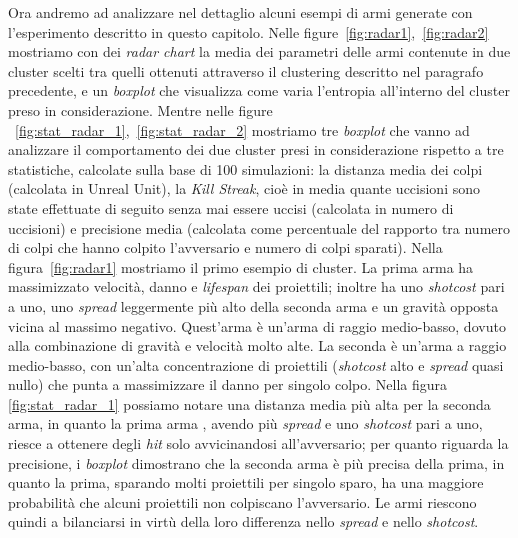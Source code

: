 \documentclass[12pt, italian]{toptesi}
\begin{document}
Ora andremo ad analizzare nel dettaglio alcuni esempi di armi generate con l'esperimento descritto in questo capitolo.
Nelle figure~\ref{fig:radar1},~\ref{fig:radar2} mostriamo con dei \emph{radar chart} la media dei parametri delle armi contenute in due cluster scelti tra quelli ottenuti attraverso il clustering descritto nel paragrafo precedente, e un \emph{boxplot} che visualizza come varia l'entropia all'interno del cluster preso in considerazione.
Mentre nelle figure ~\ref{fig:stat_radar_1},~\ref{fig:stat_radar_2} mostriamo tre \emph{boxplot} che vanno ad analizzare il comportamento dei due cluster presi in considerazione rispetto a tre statistiche, calcolate sulla base di 100 simulazioni: la distanza media dei colpi (calcolata in Unreal Unit),  la \emph{Kill Streak}, cioè in media quante uccisioni sono state effettuate di seguito senza mai essere uccisi (calcolata in numero di uccisioni) e precisione media (calcolata come percentuale del rapporto tra numero di colpi che hanno colpito l'avversario e numero di colpi sparati).
Nella figura~\ref{fig:radar1} mostriamo il primo esempio di cluster.
La prima arma ha massimizzato velocità, danno e \emph{lifespan} dei proiettili; inoltre ha uno \emph{shotcost} pari a uno, uno \emph{spread} leggermente più alto della seconda arma e un gravità opposta vicina al massimo negativo. Quest'arma è un'arma di raggio medio-basso, dovuto alla combinazione di gravità e velocità molto alte. La seconda è un'arma a raggio medio-basso, con un'alta concentrazione di proiettili (\emph{shotcost} alto e \emph{spread} quasi nullo) che punta a massimizzare il danno per singolo colpo.
Nella figura \ref{fig:stat_radar_1} possiamo notare una distanza media più alta per la seconda arma, in quanto la prima arma , avendo più \emph{spread} e uno \emph{shotcost} pari a uno, riesce a ottenere degli \emph{hit} solo avvicinandosi all'avversario; per quanto riguarda la precisione, i \emph{boxplot} dimostrano che la seconda arma è più precisa della prima, in quanto la prima, sparando molti proiettili per singolo sparo, ha una maggiore probabilità che alcuni proiettili non colpiscano l'avversario.
Le armi riescono quindi a bilanciarsi in virtù della loro differenza nello \emph{spread} e nello \emph{shotcost}.
\end{document}
